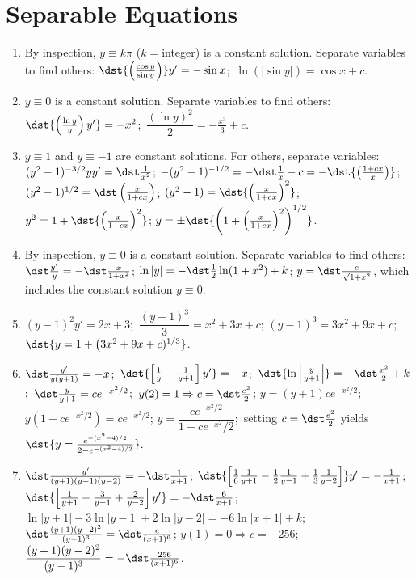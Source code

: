 \documentclass[openany]{book}
\newenvironment{sectionSolutions}{
 \begin{enumerate}[item-label={\thesection.\arabic{enumi}.}]
}{
 \end{enumerate}
}
\begin{document}
\section{Separable Equations}

\begin{sectionSolutions}
\item
By inspection, $y\equiv k\pi$ ($k=$integer) is a constant solution.
Separate variables to find others: $\dst{\left(\frac{\cos y}{\sin
y}\right)}y'=-\sin x$;\ $\ln (|\sin y|)=\cos x+c$.



\item
 $y\equiv0$ is a  constant solution.
Separate variables to find others: $\dst{\left(\frac{\ln y}{
y}\right)y'}=-x^2$;\ $\dfrac{(\ln y)^2}{2}=-\frac{x^3}{3}+c$.


\item
 $y\equiv1$ and $y\equiv-1$ are constant solutions.
For others, separate variables:
$(y^2-1)^{-3/2}yy'=\dst\frac{1}{ x^2}$;\;
$-(y^2-1)^{-1/2}=-\dst\frac{1}{ x}-c=-\dst{\left(\frac{1+cx}{ x}\right)}$;\;
$(y^2-1)^{1/2}=\dst\left(\frac{x}{1+cx}\right)$;\;
$(y^2-1)=\dst{\left(\frac{x}{1+cx}\right)^2}$;\;
$y^2=1+\dst{\left(\frac{x}{1+cx}\right)^2}$;\;
$y=\pm\dst{\left(1+\left(\frac{x}{1+cx}\right)^2\right)^{1/2}}$.


\item
By inspection, $y\equiv0$ is a constant solution. Separate variables
to find others: $\dst\frac{y'}{ y}=-\dst\frac{x}{1+x^2}$;\;
$\ln|y|=-\dst\frac{1}{2}\ln(1+x^2)+k$;\;
 $y=\dst\frac{c}{\sqrt{1+x^2}}$,
which includes the constant solution $y\equiv0$.


\item
$(y-1)^2y'=2x+3$;\ $\dfrac{(y-1)^3}{3}=x^2+3x+c$;\;
$(y-1)^3=3x^2+9x+c$;\;
$\dst{y=1+\big(3x^2+9x+c)^{1/3}}$.



\item
$\dst\frac{y'}{ y(y+1)}=-x$;\ $\dst{\left[\frac{1}{ y}-\frac{1}{
y+1}\right]y'}=-x$;\ $\dst{\ln\left|\frac{y}{
y+1}\right|}=-\dst\frac{x^2}{2}+k$;\ $\dst\frac{y}{
y+1}=ce^{-x^2/2}$;\ $y(2)=1\Rightarrow c=\dst\frac{e^2}{2}$;\;
$y=(y+1)ce^{-x^2/2}$;\ $y(1-ce^{-x^2/2})=ce^{-x^2/2}$;\;
$y=\dfrac{ce^{-x^2/2}}{1-ce^{-x^2}/2}$;\ setting
$c=\dst\frac{e^2}{2}$ yields
 $\dst{y=\frac{e^{-(x^2-4)/2}
}{2-e^{-(x^2-4)/2}}}$.


\item
$\dst\frac{y'}{(y+1)(y-1)(y-2)}=-\dst\frac{1}{ x+1}$;\;
$\dst{\left[\frac{1}{6}\frac{1}{ y+1}-\frac{1}{2}\frac{1}{
y-1}+\frac{1}{3}\frac{1}{ y-2}\right]}y'=-\frac{1}{ x+1}$;\;
$\dst{\left[\frac{1}{ y+1}-\frac{3}{ y-1}+\frac{2}{
y-2}\right]y'}=-\dst\frac{6}{ x+1}$;\;
$\ln|y+1|-3\ln|y-1|+2\ln|y-2|=-6\ln|x+1|+k$;\;
$\dst\frac{(y+1)(y-2)^2}{(y-1)^3}=\dst\frac{c}{(x+1)^6}$;\;
$y(1)=0\Rightarrow c=-256$;\;
$\dfrac{(y+1)(y-2)^2}{(y-1)^3}=-\dst\frac{256}{(x+1)^6}$.



\end{sectionSolutions}
\end{document}
